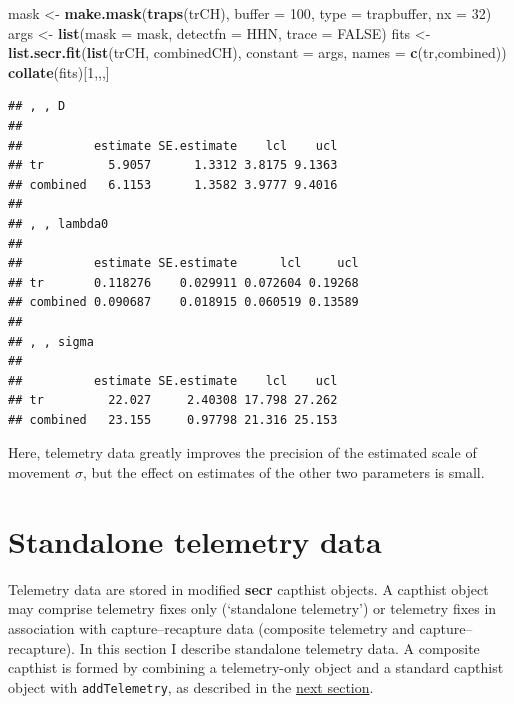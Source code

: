 \documentclass[
]{book}
\newenvironment{Shaded}{\begin{snugshade}}{\end{snugshade}}
\newcommand{\AttributeTok}[1]{\textcolor[rgb]{0.13,0.29,0.53}{#1}}
\newcommand{\ConstantTok}[1]{\textcolor[rgb]{0.56,0.35,0.01}{#1}}
\newcommand{\DecValTok}[1]{\textcolor[rgb]{0.00,0.00,0.81}{#1}}
\newcommand{\FunctionTok}[1]{\textcolor[rgb]{0.13,0.29,0.53}{\textbf{#1}}}
\newcommand{\NormalTok}[1]{#1}
\newcommand{\OtherTok}[1]{\textcolor[rgb]{0.56,0.35,0.01}{#1}}
\newcommand{\StringTok}[1]{\textcolor[rgb]{0.31,0.60,0.02}{#1}}
\begin{document}
\begin{Shaded}
\begin{Highlighting}[]
\NormalTok{mask }\OtherTok{\textless{}{-}} \FunctionTok{make.mask}\NormalTok{(}\FunctionTok{traps}\NormalTok{(trCH), }\AttributeTok{buffer =} \DecValTok{100}\NormalTok{, }\AttributeTok{type =} \StringTok{\textquotesingle{}trapbuffer\textquotesingle{}}\NormalTok{, }
    \AttributeTok{nx =} \DecValTok{32}\NormalTok{)}
\NormalTok{args }\OtherTok{\textless{}{-}} \FunctionTok{list}\NormalTok{(}\AttributeTok{mask =}\NormalTok{ mask, }\AttributeTok{detectfn =} \StringTok{\textquotesingle{}HHN\textquotesingle{}}\NormalTok{, }\AttributeTok{trace =} \ConstantTok{FALSE}\NormalTok{)}
\NormalTok{fits }\OtherTok{\textless{}{-}} \FunctionTok{list.secr.fit}\NormalTok{(}\FunctionTok{list}\NormalTok{(trCH, combinedCH), }\AttributeTok{constant =}\NormalTok{ args, }
    \AttributeTok{names =} \FunctionTok{c}\NormalTok{(}\StringTok{\textquotesingle{}tr\textquotesingle{}}\NormalTok{,}\StringTok{\textquotesingle{}combined\textquotesingle{}}\NormalTok{))}
\FunctionTok{collate}\NormalTok{(fits)[}\DecValTok{1}\NormalTok{,,,]}
\end{Highlighting}
\end{Shaded}

\begin{verbatim}
## , , D
## 
##          estimate SE.estimate    lcl    ucl
## tr         5.9057      1.3312 3.8175 9.1363
## combined   6.1153      1.3582 3.9777 9.4016
## 
## , , lambda0
## 
##          estimate SE.estimate      lcl     ucl
## tr       0.118276    0.029911 0.072604 0.19268
## combined 0.090687    0.018915 0.060519 0.13589
## 
## , , sigma
## 
##          estimate SE.estimate    lcl    ucl
## tr         22.027     2.40308 17.798 27.262
## combined   23.155     0.97798 21.316 25.153
\end{verbatim}

Here, telemetry data greatly improves the precision of the estimated scale of movement \(\sigma\), but the effect on estimates of the other two parameters is small.

\section{Standalone telemetry data}\label{standalone-telemetry-data}

Telemetry data are stored in modified \textbf{secr} capthist objects. A capthist object may comprise telemetry fixes only (`standalone telemetry') or telemetry fixes in association with capture--recapture data (composite telemetry and capture--recapture). In this section I describe standalone telemetry data. A composite capthist is formed by combining a telemetry-only object and a standard capthist object with \texttt{addTelemetry}, as described in the \hyperref[composite]{next section}.
\end{document}
